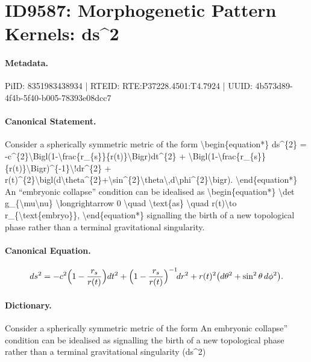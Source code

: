 \section*{ID9587: Morphogenetic Pattern Kernels: ds\textasciicircum{}2}
\paragraph{Metadata.}
PiID: 8351983438934 | RTEID: RTE:P37228.4501:T4.7924 | UUID: 4b573d89-4f4b-5f40-b005-78393e08dcc7

\paragraph{Canonical Statement.}
Consider a spherically symmetric metric of the form \textbackslash{}begin\{equation*\} ds\textasciicircum{}\{2\} = -c\textasciicircum{}\{2\}\textbackslash{}Bigl(1-\textbackslash{}frac\{r\_\{s\}\}\{r(t)\}\textbackslash{}Bigr)dt\textasciicircum{}\{2\} + \textbackslash{}Bigl(1-\textbackslash{}frac\{r\_\{s\}\}\{r(t)\}\textbackslash{}Bigr)\textasciicircum{}\{-1\}\textbackslash{}!dr\textasciicircum{}\{2\} + r(t)\textasciicircum{}\{2\}\textbackslash{}bigl(d\textbackslash{}theta\textasciicircum{}\{2\}+\textbackslash{}sin\textasciicircum{}\{2\}\textbackslash{}theta\textbackslash{},d\textbackslash{}phi\textasciicircum{}\{2\}\textbackslash{}bigr). \textbackslash{}end\{equation*\} An ``embryonic collapse'' condition can be idealised as \textbackslash{}begin\{equation*\} \textbackslash{}det g\_\{\textbackslash{}mu\textbackslash{}nu\} \textbackslash{}longrightarrow 0 \textbackslash{}quad \textbackslash{}text\{as\} \textbackslash{}quad r(t)\textbackslash{}to r\_\{\textbackslash{}text\{embryo\}\}, \textbackslash{}end\{equation*\} signalling the birth of a new topological phase rather than a terminal gravitational singularity.

\paragraph{Canonical Equation.}
\[
ds^{2} = -c^{2}\Bigl(1-\frac{r_{s}}{r(t)}\Bigr)dt^{2} + \Bigl(1-\frac{r_{s}}{r(t)}\Bigr)^{-1}\!dr^{2} + r(t)^{2}\bigl(d\theta^{2}+\sin^{2}\theta\,d\phi^{2}\bigr).
\]

\paragraph{Dictionary.}
Consider a spherically symmetric metric of the form An embryonic collapse'' condition can be idealised as signalling the birth of a new topological phase rather than a terminal gravitational singularity (ds\textasciicircum{}2)

